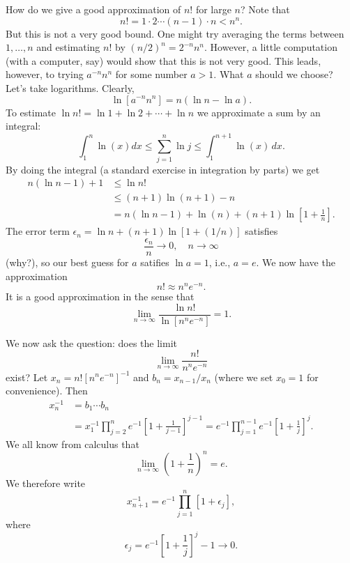 \documentclass{stml-l}
\theoremstyle{definition}
\numberwithin{equation}{chapter}
\numberwithin{figure}{chapter}
\numberwithin{figure}{section}
\begin{document}
How do we give a good approximation of $n!$ for large $n$? Note that
\begin{equation*}
n!=1\cdot 2\cdots(n-1)\cdot n<n^{n}.
\end{equation*}
But this is not a very good bound. One might try averaging the terms
between $1,\ldots,n$ and estimating $n!$ by $(n/2)^{n}=2^{-n}n^{n}$.
However, a little computation (with a computer, say) would show that
this is not very good. This leads, however, to trying $a^{-n}n^{n}$
for some number $a>1$. What $a$ should we choose? Let's take
logarithms. Clearly,
\begin{equation*}
\ln[a^{-n}n^{n}]=n(\ln n-\ln a).
\end{equation*}
To estimate $\ln n!=\ln 1+\ln 2+\cdots+\ln n$ we approximate a sum by an integral:
\begin{equation*}
\int_{1}^{n}\ln(x)dx\leq\sum\limits_{j=1}^{n}\ln
j\leq\int_{1}^{n+1}\ln(x)\,dx.
\end{equation*}
By doing the integral (a standard exercise in integration by parts) we get
\begin{align*}
n(\ln n-1)+1&\leq \ln n!\\
&\leq (n+1)\ln(n+1)-n\\
&=n(\ln n-1)+\ln(n)+(n+1)\ln\left[1+\frac{1}{n}\right].
\end{align*}
The error term $\epsilon_{n}=\ln n+(n+1)\ln[1+(1/n)]$ satisfies
\begin{equation*}
\frac{\epsilon_{n}}{n}\rightarrow 0,\quad n\rightarrow\infty
\end{equation*}
(why?), so our best guess for $a$ satifies $\ln a=1$, i.e., $a=e$.
We now have the approximation
\begin{equation*}
n!\approx n^{n}e^{-n}.
\end{equation*}
It is a good approximation in the sense that
\begin{equation*}
\lim_{n\rightarrow\infty}\frac{\ln n!}{\ln[n^{n}e^{-n}]}=1.
\end{equation*}

We now ask the question: does the limit
\begin{equation*}
\lim_{n\rightarrow\infty}\frac{n!}{n^{n}e^{-n}}
\end{equation*}
exist? Let $x_{n}=n![n^{n}e^{-n}]^{-1}$ and $b_{n}=x_{n-1}/x_{n}$
(where we set $x_{0}=1$ for convenience). Then
\begin{align*}
x_{n}^{-1}&=b_{1}\cdots b_{n}\\
&=x_{1}^{-1}\prod\limits_{j=2}^{n}e^{-1}\left[1+\frac{1}{j-1}\right]^{j-1}=e^{-1}\prod\limits_{j=1}^{n-1}e^{-1}\left[1+\frac{1}{j}\right]^{j}.
\end{align*}
We all know from calculus that
\begin{equation*}
\lim_{n\rightarrow\infty}\left(1+\frac{1}{n}\right)^{n}=e.
\end{equation*}
We therefore write
\begin{equation*}
x_{n+1}^{-1}=e^{-1}\prod\limits_{j=1}^{n}[1+\epsilon_{j}],
\end{equation*}
where
\begin{equation*}
\epsilon_{j}=e^{-1}\left[1+\frac{1}{j}\right]^{j}-1\rightarrow 0.
\end{equation*}
\end{document}
